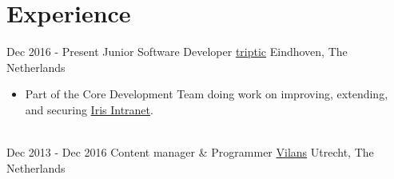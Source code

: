 \documentclass[letterpaper]{twentysecondcv} %
\begin{document}

\section{Experience}
\begin{twenty} %
\twentyitem
    	{Dec 2016 -}
		{Present}
        {Junior Software Developer}
		{\href{http://triptic.nl}{triptic}}
        {Eindhoven, The Netherlands}
        {\begin{itemize}
        \item Part of the Core Development Team doing work on improving, extending, and securing \href{https://www.irisintranet.com/}{Iris Intranet}.
        \end{itemize}}
        \\
	\twentyitem
    	{Dec 2013 -}
		{Dec 2016}
		{Content manager \& Programmer}
		{\href{http://www.vilans.nl/}{Vilans}}
        {Utrecht, The Netherlands}
        {}
\end{twenty}

\end{document}
